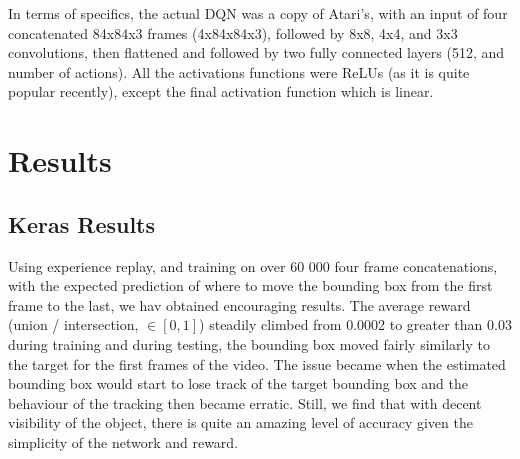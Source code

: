 \documentclass[letterpaper,12pt,titlepage,oneside,final]{book}
\begin{document}
In terms of specifics, the actual DQN was a copy of Atari's, with an input of four concatenated 84x84x3 frames (4x84x84x3), followed by 8x8, 4x4, and 3x3 convolutions, then flattened and followed by two fully connected layers (512, and number of actions). All the activations functions were ReLUs (as it is quite popular recently), except the final activation function which is linear.


\chapter{Results}
\section{Keras Results}
Using experience replay, and training on over 60 000 four frame concatenations, with the expected prediction of where to move the bounding box from the first frame to the last, we hav obtained encouraging results. The average reward (union / intersection, $\in [0,1]$) steadily climbed from 0.0002 to greater than 0.03 during training and during testing, the bounding box moved fairly similarly to the target for the first frames of the video. The issue became when the estimated bounding box would start to lose track of the target bounding box and the behaviour of the tracking then became erratic. Still, we find that with decent visibility of the object, there is quite an amazing level of accuracy given the simplicity of the network and reward.
\end{document}
